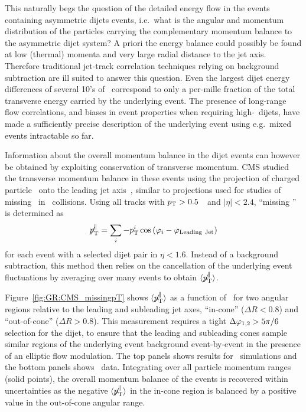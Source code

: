 This naturally begs the question of the detailed energy flow in the events containing asymmetric
dijets events, i.e.\ what is the angular and momentum distribution of the particles carrying
the complementary momentum balance to the asymmetric dijet system? A priori the energy balance
could possibly be found at low (thermal) momenta and very large radial distance to the jet axis.
Therefore traditional jet-track correlation techniques relying on background subtraction are ill suited
to answer this question. Even the largest dijet energy differences of several 10's of \GeV\
correspond to only a per-mille fraction of the total transverse energy carried by the underlying
event. The presence of long-range flow correlations, and biases in event properties when requiring
high-\pT\ dijets, have made a sufficiently precise description of the underlying event using e.g.\
mixed events intractable so far.

Information about the overall momentum balance in the dijet events can however be obtained by exploiting
conservation of transverse momentum. CMS studied the transverse momentum balance in these events
using the projection of charged particle \pT\ onto the leading
jet axis~\cite{Chatrchyan:2011sx}, similar to projections used for studies of missing \pT\ in \pp\
collisions.  Using all tracks with $\mbox{$p_{\mathrm{T}}$} > 0.5$~\GeVc\ and $|\eta| < 2.4$,
``missing \pT'' is determined as
\begin{equation}
\displaystyle{\not} p_{\mathrm{T}}^{\parallel} =
\sum_{i}{ -p_{\mathrm{T}}^{i}\cos{(\varphi_{i}-\varphi_{\rm Leading\ Jet})}}
\end{equation}
for each event with a selected dijet pair in $\eta < 1.6$.
Instead of a background subtraction, this method then relies on the cancellation of the
underlying event fluctuations by averaging over many events to obtain
$\langle \displaystyle{\not} p_{\mathrm{T}}^{\parallel} \rangle$.

Figure~\ref{fig:GR:CMS_missingpT} shows $\langle \displaystyle{\not} p_{\mathrm{T}}^{\parallel} \rangle$
as a function of \AJ\ for two angular regions relative to the leading and subleading
jet axes, ``in-cone'' ($\Delta R < 0.8$) and ``out-of-cone'' ($\Delta R > 0.8$).
This measurement requires a tight $\Delta\varphi_{1,2} > 5 \pi/6$ selection for the dijet, to ensure that the
leading and subleading cones sample similar regions of the underlying event background
event-by-event in the presence of an elliptic flow modulation.
The top panels shows results for \PYTHYD\ simulations and the bottom panels shows
\PbPb\ data. Integrating over all particle momentum ranges (solid points),
 the overall momentum balance of the events is recovered within uncertainties
as the negative $\langle \displaystyle{\not} p_{\mathrm{T}}^{\parallel} \rangle$ in
the in-cone region is balanced by a positive value in the out-of-cone angular range.

